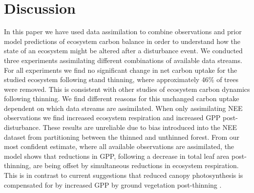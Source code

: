 \section{Discussion}
In this paper we have used data assimilation to combine observations and prior model predictions of ecosystem carbon balance in order to understand how the state of an ecosystem might be altered after a disturbance event. We conducted three experiments assimilating different combinations of available data streams. For all experiments we find no significant change in net carbon uptake for the studied ecosystem following stand thinning, where approximately 46\% of trees were removed. This is consistent with other studies of ecosystem carbon dynamics following thinning. We find different reasons for this unchanged carbon uptake dependent on which data streams are assimilated. When only assimilating NEE observations we find increased ecosystem respiration and increased GPP post-disturbance. These results are unreliable due to bias introduced into the NEE dataset from partitioning between the thinned and unthinned forest. From our most confident estimate, where all available observations are assimilated, the model shows that reductions in GPP, following a decrease in total leaf area post-thinning, are being offset by simultaneous reductions in ecosystem respiration. This is in contrast to current suggestions that reduced canopy photosynthesis is compensated for by increased GPP by ground vegetation post-thinning \citep{vesala2005effect, moreaux2011paired, dore2012recovery, wilkinson2016}.


